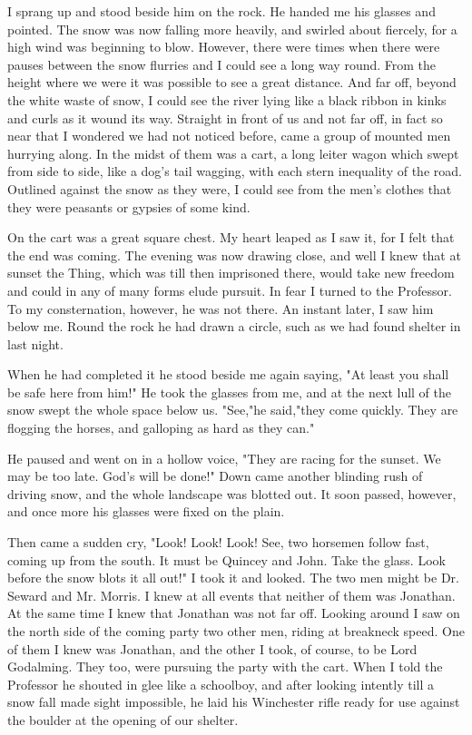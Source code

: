 I sprang up and stood beside him on the rock. He handed me his glasses and pointed. The snow was now falling more heavily, and swirled about fiercely, for a high wind was beginning to blow. However, there were times when there were pauses between the snow flurries and I could see a long way round. From the height where we were it was possible to see a great distance. And far off, beyond the white waste of snow, I could see the river lying like a black ribbon in kinks and curls as it wound its way. Straight in front of us and not far off, in fact so near that I wondered we had not noticed before, came a group of mounted men hurrying along. In the midst of them was a cart, a long leiter wagon which swept from side to side, like a dog's tail wagging, with each stern inequality of the road. Outlined against the snow as they were, I could see from the men's clothes that they were peasants or gypsies of some kind. 

On the cart was a great square chest. My heart leaped as I saw it, for I felt that the end was coming. The evening was now drawing close, and well I knew that at sunset the Thing, which was till then imprisoned there, would take new freedom and could in any of many forms elude pursuit. In fear I turned to the Professor. To my consternation, however, he was not there. An instant later, I saw him below me. Round the rock he had drawn a circle, such as we had found shelter in last night. 

When he had completed it he stood beside me again saying, "At least you shall be safe here from him!" He took the glasses from me, and at the next lull of the snow swept the whole space below us. "See,"he said,"they come quickly. They are flogging the horses, and galloping as hard as they can." 

He paused and went on in a hollow voice, "They are racing for the sunset. We may be too late. God's will be done!" Down came another blinding rush of driving snow, and the whole landscape was blotted out. It soon passed, however, and once more his glasses were fixed on the plain. 

Then came a sudden cry, "Look! Look! Look! See, two horsemen follow fast, coming up from the south. It must be Quincey and John. Take the glass. Look before the snow blots it all out!" I took it and looked. The two men might be Dr. Seward and Mr. Morris. I knew at all events that neither of them was Jonathan. At the same time I knew that Jonathan was not far off. Looking around I saw on the north side of the coming party two other men, riding at breakneck speed. One of them I knew was Jonathan, and the other I took, of course, to be Lord Godalming. They too, were pursuing the party with the cart. When I told the Professor he shouted in glee like a schoolboy, and after looking intently till a snow fall made sight impossible, he laid his Winchester rifle ready for use against the boulder at the opening of our shelter. 

